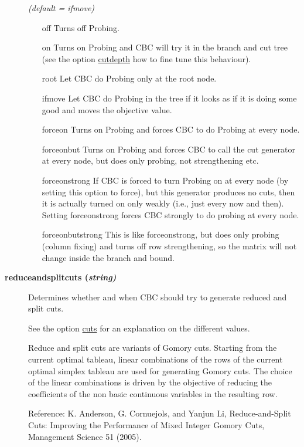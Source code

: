\begin{description}
\textsl{(default = ifmove)}
\begin{itemize}
\item[off] 
Turns off Probing.
\item[on] 
Turns on Probing and CBC will try it in the branch and cut tree (see the option \hyperlink{cutdepth}{cutdepth} how to fine tune this behaviour).
\item[root] 
Let CBC do Probing only at the root node.
\item[ifmove] 
Let CBC do Probing in the tree if it looks as if it is doing some good and moves the objective value.
\item[forceon] 
Turns on Probing and forces CBC to do Probing at every node.
\item[forceonbut] 
Turns on Probing and forces CBC to call the cut generator at every node, but does only probing, not strengthening etc.
\item[forceonstrong] 
If CBC is forced to turn Probing on at every node (by setting this option to force), but this generator produces no cuts, then it is actually turned on only weakly (i.e., just every now and then).
Setting forceonstrong forces CBC strongly to do probing at every node.
\item[forceonbutstrong] 
This is like forceonstrong, but does only probing (column fixing) and turns off row strengthening, so the matrix will not change inside the branch and bound.
\end{itemize}

\item[\label{reduceandsplitcuts}\hypertarget{reduceandsplitcuts}
{\textbf{reduceandsplitcuts (\slshape{string})}}]\hspace{1.0in}

Determines whether and when CBC should try to generate reduced and split cuts.

See the option \hyperlink{cuts}{cuts} for an explanation on the different values.

Reduce and split cuts are variants of Gomory cuts.
Starting from the current optimal tableau, linear combinations of the rows of the current optimal simplex tableau are used for generating Gomory cuts.
The choice of the linear combinations is driven by the objective of reducing the coefficients of the non basic continuous variables in the resulting row.

Reference: K. Anderson, G. Cornuejols, and Yanjun Li, Reduce-and-Split Cuts: Improving the Performance of Mixed Integer Gomory Cuts, Management Science 51 (2005).


\end{description}
